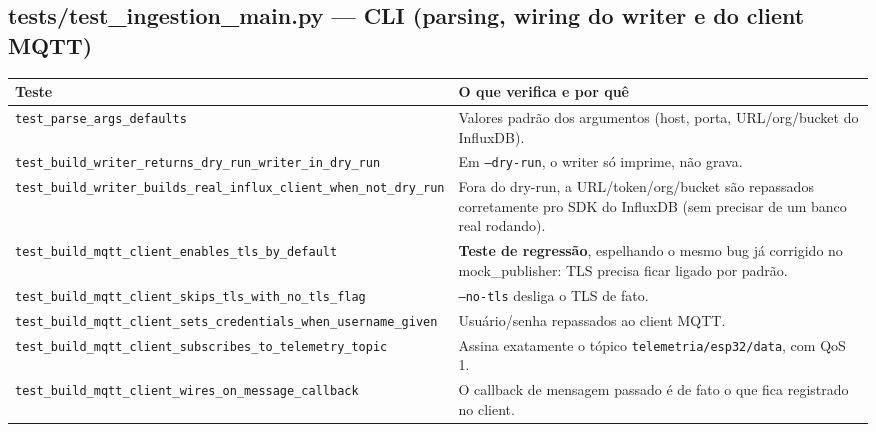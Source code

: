 \documentclass[10pt,a4paper]{article}
\begin{document}
\subsection{tests/test\_\allowbreak ingestion\_\allowbreak main.py --- CLI (parsing, wiring do writer e do client MQTT)}

\begin{center}
\begin{longtable}{L{5cm}L{9.5cm}}
\toprule
\textbf{Teste} & \textbf{O que verifica e por quê} \\
\midrule
\endhead
\texttt{test\_\allowbreak parse\_\allowbreak args\_\allowbreak defaults} & Valores padrão dos argumentos (host, porta, URL/org/bucket do InfluxDB). \\
\texttt{test\_\allowbreak build\_\allowbreak writer\_\allowbreak returns\_\allowbreak dry\_\allowbreak run\_\allowbreak writer\_\allowbreak in\_\allowbreak dry\_\allowbreak run} & Em \texttt{--dry-run}, o writer só imprime, não grava. \\
\texttt{test\_\allowbreak build\_\allowbreak writer\_\allowbreak builds\_\allowbreak real\_\allowbreak influx\_\allowbreak client\_\allowbreak when\_\allowbreak not\_\allowbreak dry\_\allowbreak run} & Fora do dry-run, a URL/token/org/bucket são repassados corretamente pro SDK do InfluxDB (sem precisar de um banco real rodando). \\
\texttt{test\_\allowbreak build\_\allowbreak mqtt\_\allowbreak client\_\allowbreak enables\_\allowbreak tls\_\allowbreak by\_\allowbreak default} & \textbf{Teste de regressão}, espelhando o mesmo bug já corrigido no mock\_\allowbreak publisher: TLS precisa ficar ligado por padrão. \\
\texttt{test\_\allowbreak build\_\allowbreak mqtt\_\allowbreak client\_\allowbreak skips\_\allowbreak tls\_\allowbreak with\_\allowbreak no\_\allowbreak tls\_\allowbreak flag} & \texttt{--no-tls} desliga o TLS de fato. \\
\texttt{test\_\allowbreak build\_\allowbreak mqtt\_\allowbreak client\_\allowbreak sets\_\allowbreak credentials\_\allowbreak when\_\allowbreak username\_\allowbreak given} & Usuário/senha repassados ao client MQTT. \\
\texttt{test\_\allowbreak build\_\allowbreak mqtt\_\allowbreak client\_\allowbreak subscribes\_\allowbreak to\_\allowbreak telemetry\_\allowbreak topic} & Assina exatamente o tópico \texttt{telemetria/esp32/data}, com QoS 1. \\
\texttt{test\_\allowbreak build\_\allowbreak mqtt\_\allowbreak client\_\allowbreak wires\_\allowbreak on\_\allowbreak message\_\allowbreak callback} & O callback de mensagem passado é de fato o que fica registrado no client. \\
\bottomrule
\end{longtable}
\end{center}
\end{document}

